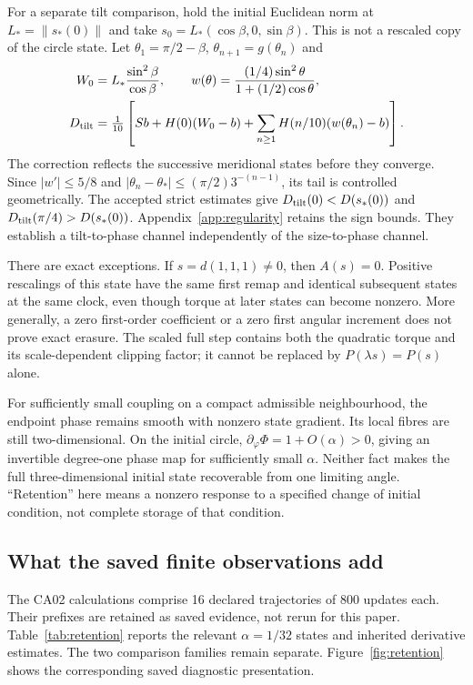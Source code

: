 \documentclass[11pt,a4paper]{article}
\numberwithin{equation}{section}
\begin{document}
For a separate tilt comparison, hold the initial Euclidean norm at $L_*=\|s_*(0)\|$ and take $s_0=L_*(\cos\beta,0,\sin\beta)$. This is not a rescaled copy of the circle state. Let $\theta_1=\pi/2-\beta$, $\theta_{n+1}=g(\theta_n)$ and
\begin{equation}\label{eq:tilt}
\begin{aligned}
W_0&=L_*\frac{\sin^2\beta}{\cos\beta},\qquad
w(\theta)=\frac{(1/4)\sin^2\theta}{1+(1/2)\cos\theta},\\
D_{\rm tilt}&=\tfrac1{10}\left[Sb+H(0)(W_0-b)+\sum_{n\ge1}H(n/10)(w(\theta_n)-b)\right].
\end{aligned}
\end{equation}
The correction reflects the successive meridional states before they converge. Since $|w'|\le5/8$ and $|\theta_n-\theta_*|\le(\pi/2)3^{-(n-1)}$, its tail is controlled geometrically. The accepted strict estimates give $D_{\rm tilt}(0)<D(s_*(0))$ and $D_{\rm tilt}(\pi/4)>D(s_*(0))$. Appendix~\ref{app:regularity} retains the sign bounds. They establish a tilt-to-phase channel independently of the size-to-phase channel.

There are exact exceptions. If $s=d(1,1,1)\ne0$, then $A(s)=0$. Positive rescalings of this state have the same first remap and identical subsequent states at the same clock, even though torque at later states can become nonzero. More generally, a zero first-order coefficient or a zero first angular increment does not prove exact erasure. The scaled full step contains both the quadratic torque and its scale-dependent clipping factor; it cannot be replaced by $P(\lambda s)=P(s)$ alone.

For sufficiently small coupling on a compact admissible neighbourhood, the endpoint phase remains smooth with nonzero state gradient. Its local fibres are still two-dimensional. On the initial circle, $\partial_\varphi\Phi=1+O(\alpha)>0$, giving an invertible degree-one phase map for sufficiently small $\alpha$. Neither fact makes the full three-dimensional initial state recoverable from one limiting angle. ``Retention'' here means a nonzero response to a specified change of initial condition, not complete storage of that condition.

\subsection{What the saved finite observations add}
The CA02 calculations comprise 16 declared trajectories of 800 updates each. Their prefixes are retained as saved evidence, not rerun for this paper. Table~\ref{tab:retention} reports the relevant $\alpha=1/32$ states and inherited derivative estimates. The two comparison families remain separate. Figure~\ref{fig:retention} shows the corresponding saved diagnostic presentation.
\end{document}
